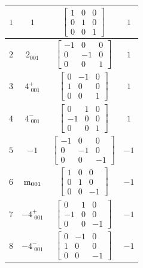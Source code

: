 \documentclass[fleqn,8pt]{jsarticle}
\begin{document}
\begin{longtable}{cccc}
$ 1 $ & $ 1 $ & $ \begin{bmatrix} 1 & 0 & 0 \\ 0 & 1 & 0 \\ 0 & 0 & 1 \end{bmatrix} $ & $ 1 $ \\ \hline
$ 2 $ & $ 2{}_{001} $ & $ \begin{bmatrix} -1 & 0 & 0 \\ 0 & -1 & 0 \\ 0 & 0 & 1 \end{bmatrix} $ & $ 1 $ \\ \hline
$ 3 $ & $ 4^{+}_{\,\,001} $ & $ \begin{bmatrix} 0 & -1 & 0 \\ 1 & 0 & 0 \\ 0 & 0 & 1 \end{bmatrix} $ & $ 1 $ \\ \hline
$ 4 $ & $ 4^{-}_{\,\,001} $ & $ \begin{bmatrix} 0 & 1 & 0 \\ -1 & 0 & 0 \\ 0 & 0 & 1 \end{bmatrix} $ & $ 1 $ \\ \hline
$ 5 $ & $ -1 $ & $ \begin{bmatrix} -1 & 0 & 0 \\ 0 & -1 & 0 \\ 0 & 0 & -1 \end{bmatrix} $ & $ -1 $ \\ \hline
$ 6 $ & $ {\rm m}_{001} $ & $ \begin{bmatrix} 1 & 0 & 0 \\ 0 & 1 & 0 \\ 0 & 0 & -1 \end{bmatrix} $ & $ -1 $ \\ \hline
$ 7 $ & $ -4^{+}_{\,\,001} $ & $ \begin{bmatrix} 0 & 1 & 0 \\ -1 & 0 & 0 \\ 0 & 0 & -1 \end{bmatrix} $ & $ -1 $ \\ \hline
$ 8 $ & $ -4^{-}_{\,\,001} $ & $ \begin{bmatrix} 0 & -1 & 0 \\ 1 & 0 & 0 \\ 0 & 0 & -1 \end{bmatrix} $ & $ -1 $ \\
\end{longtable}
\end{document}
